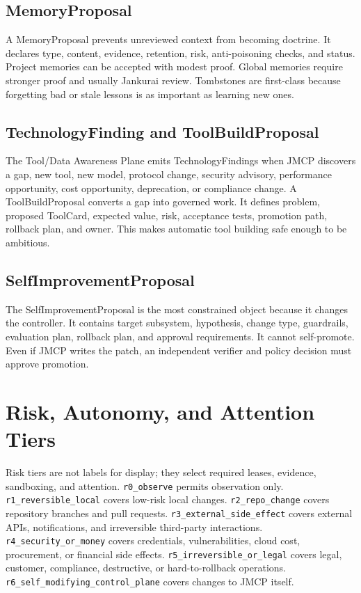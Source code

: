 \documentclass[10pt,journal,onecolumn]{IEEEtran}
\begin{document}
\subsection{MemoryProposal}
A MemoryProposal prevents unreviewed context from becoming doctrine. It declares type, content, evidence, retention, risk, anti-poisoning checks, and status. Project memories can be accepted with modest proof. Global memories require stronger proof and usually Jankurai review. Tombstones are first-class because forgetting bad or stale lessons is as important as learning new ones.

\subsection{TechnologyFinding and ToolBuildProposal}
The Tool/Data Awareness Plane emits TechnologyFindings when JMCP discovers a gap, new tool, new model, protocol change, security advisory, performance opportunity, cost opportunity, deprecation, or compliance change. A ToolBuildProposal converts a gap into governed work. It defines problem, proposed ToolCard, expected value, risk, acceptance tests, promotion path, rollback plan, and owner. This makes automatic tool building safe enough to be ambitious.

\subsection{SelfImprovementProposal}
The SelfImprovementProposal is the most constrained object because it changes the controller. It contains target subsystem, hypothesis, change type, guardrails, evaluation plan, rollback plan, and approval requirements. It cannot self-promote. Even if JMCP writes the patch, an independent verifier and policy decision must approve promotion.

\section{Risk, Autonomy, and Attention Tiers}
Risk tiers are not labels for display; they select required leases, evidence, sandboxing, and attention. \texttt{r0\_observe} permits observation only. \texttt{r1\_reversible\_local} covers low-risk local changes. \texttt{r2\_repo\_change} covers repository branches and pull requests. \texttt{r3\_external\_side\_effect} covers external APIs, notifications, and irreversible third-party interactions. \texttt{r4\_security\_or\_money} covers credentials, vulnerabilities, cloud cost, procurement, or financial side effects. \texttt{r5\_irreversible\_or\_legal} covers legal, customer, compliance, destructive, or hard-to-rollback operations. \texttt{r6\_self\_modifying\_control\_plane} covers changes to JMCP itself.
\end{document}
